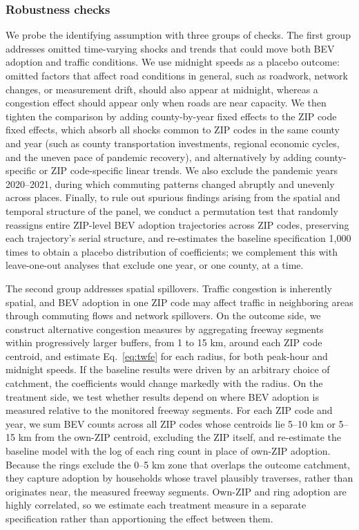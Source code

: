 \documentclass[11pt, letterpaper]{article}
\begin{document}
\subsubsection{Robustness checks}
We probe the identifying assumption with three groups of checks.
The first group addresses omitted time-varying shocks and trends that could move both BEV adoption and traffic conditions.
We use midnight speeds as a placebo outcome: omitted factors that affect road conditions in general, such as roadwork, network changes, or measurement drift, should also appear at midnight, whereas a congestion effect should appear only when roads are near capacity.
We then tighten the comparison by adding county-by-year fixed effects to the ZIP code fixed effects, which absorb all shocks common to ZIP codes in the same county and year (such as county transportation investments, regional economic cycles, and the uneven pace of pandemic recovery), and alternatively by adding county-specific or ZIP code-specific linear trends.
We also exclude the pandemic years 2020--2021, during which commuting patterns changed abruptly and unevenly across places.
Finally, to rule out spurious findings arising from the spatial and temporal structure of the panel, we conduct a permutation test that randomly reassigns entire ZIP-level BEV adoption trajectories across ZIP codes, preserving each trajectory's serial structure, and re-estimates the baseline specification 1,000 times to obtain a placebo distribution of coefficients; we complement this with leave-one-out analyses that exclude one year, or one county, at a time.

The second group addresses spatial spillovers.
Traffic congestion is inherently spatial, and BEV adoption in one ZIP code may affect traffic in neighboring areas through commuting flows and network spillovers.
On the outcome side, we construct alternative congestion measures by aggregating freeway segments within progressively larger buffers, from 1 to 15 km, around each ZIP code centroid, and estimate Eq.~\eqref{eq:twfe} for each radius, for both peak-hour and midnight speeds.
If the baseline results were driven by an arbitrary choice of catchment, the coefficients would change markedly with the radius.
On the treatment side, we test whether results depend on where BEV adoption is measured relative to the monitored freeway segments.
For each ZIP code and year, we sum BEV counts across all ZIP codes whose centroids lie 5--10 km or 5--15 km from the own-ZIP centroid, excluding the ZIP itself, and re-estimate the baseline model with the log of each ring count in place of own-ZIP adoption.
Because the rings exclude the 0--5 km zone that overlaps the outcome catchment, they capture adoption by households whose travel plausibly traverses, rather than originates near, the measured freeway segments.
Own-ZIP and ring adoption are highly correlated, so we estimate each treatment measure in a separate specification rather than apportioning the effect between them.
\end{document}
